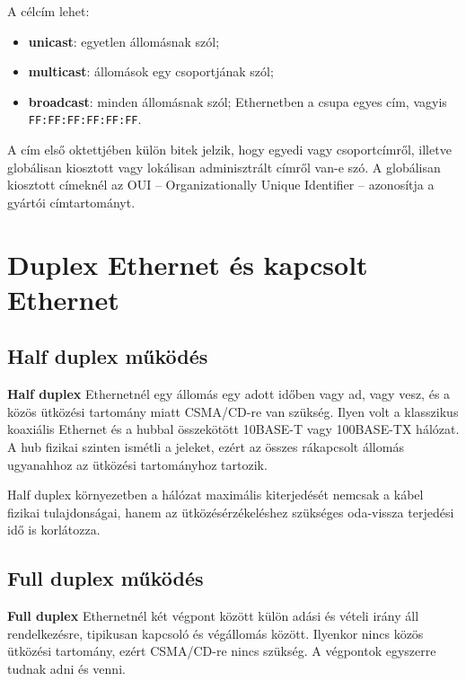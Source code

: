 A célcím lehet:

\begin{itemize}
  \item \textbf{unicast}: egyetlen állomásnak szól;
  \item \textbf{multicast}: állomások egy csoportjának szól;
  \item \textbf{broadcast}: minden állomásnak szól; Ethernetben a csupa egyes cím, vagyis \texttt{FF:FF:FF:FF:FF:FF}.
\end{itemize}

A cím első oktettjében külön bitek jelzik, hogy egyedi vagy csoportcímről, illetve globálisan kiosztott vagy lokálisan adminisztrált címről van-e szó. A globálisan kiosztott címeknél az OUI -- Organizationally Unique Identifier -- azonosítja a gyártói címtartományt.

\begin{center}

\end{center}

\section{Duplex Ethernet és kapcsolt Ethernet}

\subsection{Half duplex működés}

\textbf{Half duplex} Ethernetnél egy állomás egy adott időben vagy ad, vagy vesz, és a közös ütközési tartomány miatt CSMA/CD-re van szükség. Ilyen volt a klasszikus koaxiális Ethernet és a hubbal összekötött 10BASE-T vagy 100BASE-TX hálózat. A hub fizikai szinten ismétli a jeleket, ezért az összes rákapcsolt állomás ugyanahhoz az ütközési tartományhoz tartozik.

Half duplex környezetben a hálózat maximális kiterjedését nemcsak a kábel fizikai tulajdonságai, hanem az ütközésérzékeléshez szükséges oda-vissza terjedési idő is korlátozza.

\subsection{Full duplex működés}

\textbf{Full duplex} Ethernetnél két végpont között külön adási és vételi irány áll rendelkezésre, tipikusan kapcsoló és végállomás között. Ilyenkor nincs közös ütközési tartomány, ezért CSMA/CD-re nincs szükség. A végpontok egyszerre tudnak adni és venni.

